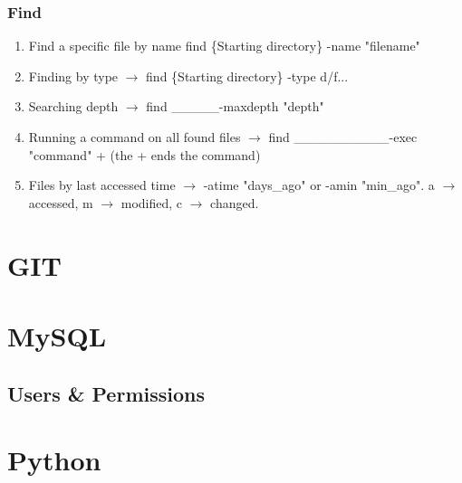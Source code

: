 \documentclass[11pt, noindent, letter]{article}
\newcommand{\ra}{$\rightarrow$ {}}
\newcommand{\blank}{\_\_\_\_\_}
\begin{document}
	\subsubsection{Find}
		\begin{enumerate}
			\item Find a specific file by name find \{Starting directory\} -name "filename"
			\item Finding by type \ra find \{Starting directory\} -type d/f...
			\item Searching depth \ra find \blank -maxdepth "depth"
			\item Running a command on all found files \ra find \blank \blank -exec "command" {} + (the + ends the command)
			\item Files by last accessed time \ra -atime "days_ago" or -amin "min_ago". a \ra accessed, m \ra modified, c \ra changed.
		\end{enumerate}

\section{GIT}

\section{MySQL}
\subsection{Users \& Permissions}

\section{Python}
\end{document}
